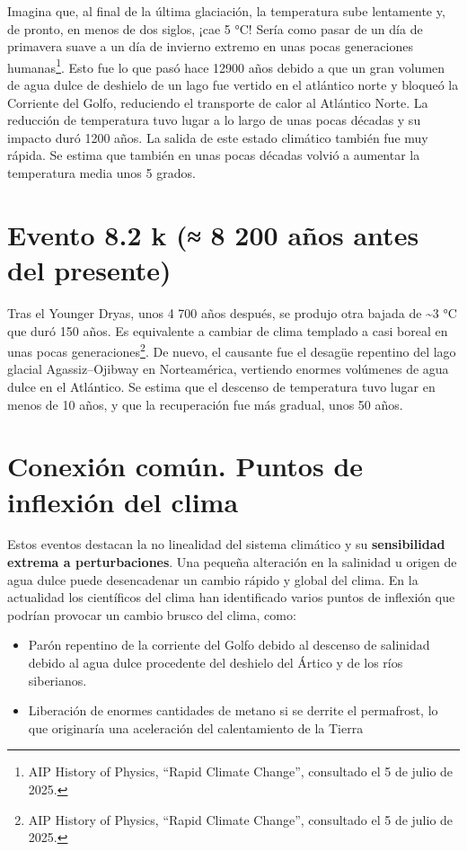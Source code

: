 \documentclass[
  11pt,
  a4paper,
  DIV=11,
  numbers=noendperiod]{scrreprt}
\providecommand{\tightlist}{%
  \setlength{\itemsep}{0pt}\setlength{\parskip}{0pt}}
\begin{document}
Imagina que, al final de la última glaciación, la temperatura sube
lentamente y, de pronto, en menos de dos siglos, ¡cae 5 °C! Sería como
pasar de un día de primavera suave a un día de invierno extremo en unas
pocas generaciones humanas\footnote{AIP History of Physics, ``Rapid
  Climate Change'', consultado el 5 de julio de 2025.}. Esto fue lo que
pasó hace 12900 años debido a que un gran volumen de agua dulce de
deshielo de un lago fue vertido en el atlántico norte y bloqueó la
Corriente del Golfo, reduciendo el transporte de calor al Atlántico
Norte. La reducción de temperatura tuvo lugar a lo largo de unas pocas
décadas y su impacto duró 1200 años. La salida de este estado climático
también fue muy rápida. Se estima que también en unas pocas décadas
volvió a aumentar la temperatura media unos 5 grados.

\section{Evento 8.2 k (≈ 8 200 años antes del
presente)}\label{evento-8.2-k-8-200-auxf1os-antes-del-presente}

Tras el Younger Dryas, unos 4 700 años después, se produjo otra bajada
de \textasciitilde3 °C que duró 150 años. Es equivalente a cambiar de
clima templado a casi boreal en unas pocas generaciones\footnote{AIP
  History of Physics, ``Rapid Climate Change'', consultado el 5 de julio
  de 2025.}. De nuevo, el causante fue el desagüe repentino del lago
glacial Agassiz--Ojibway en Norteamérica, vertiendo enormes volúmenes de
agua dulce en el Atlántico. Se estima que el descenso de temperatura
tuvo lugar en menos de 10 años, y que la recuperación fue más gradual,
unos 50 años.

\section{Conexión común. Puntos de inflexión del
clima}\label{conexiuxf3n-comuxfan.-puntos-de-inflexiuxf3n-del-clima}

Estos eventos destacan la no linealidad del sistema climático y su
\textbf{sensibilidad extrema a perturbaciones}. Una pequeña alteración
en la salinidad u origen de agua dulce puede desencadenar un cambio
rápido y global del clima. En la actualidad los científicos del clima
han identificado varios puntos de inflexión que podrían provocar un
cambio brusco del clima, como:

\begin{itemize}
\tightlist
\item
  Parón repentino de la corriente del Golfo debido al descenso de
  salinidad debido al agua dulce procedente del deshielo del Ártico y de
  los ríos siberianos.
\item
  Liberación de enormes cantidades de metano si se derrite el
  permafrost, lo que originaría una aceleración del calentamiento de la
  Tierra
\end{itemize}
\end{document}
